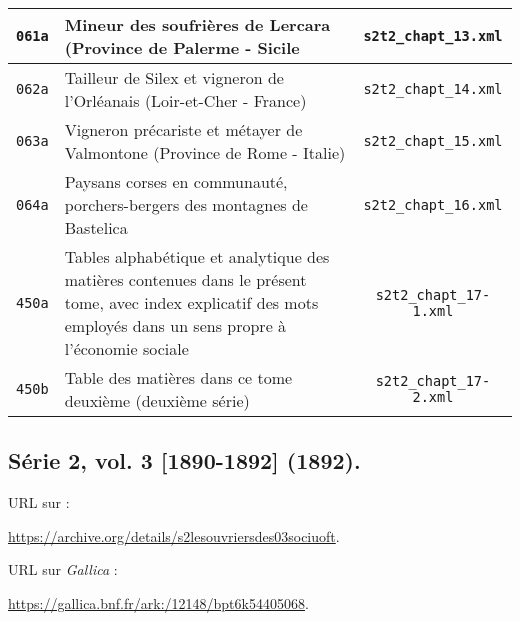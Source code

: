\begin{center}
\begin{longtable}{ | c | p{9.5cm} | c | }
\texttt{061a} & Mineur des soufrières de Lercara (Province de Palerme - Sicile & \texttt{s2t2\_chapt\_13.xml} \\ \hline
\texttt{062a} & Tailleur de Silex et vigneron de l'Orléanais (Loir-et-Cher - France) & \texttt{s2t2\_chapt\_14.xml} \\ \hline
\texttt{063a} & Vigneron précariste et métayer de Valmontone (Province de Rome - Italie) & \texttt{s2t2\_chapt\_15.xml} \\ \hline
\texttt{064a} & Paysans corses en communauté, porchers-bergers des montagnes de Bastelica & \texttt{s2t2\_chapt\_16.xml} \\ \hline
\texttt{450a} & Tables alphabétique et analytique des matières contenues dans le présent tome, avec index explicatif des mots employés dans un sens propre à l'économie sociale & \texttt{s2t2\_chapt\_17-1.xml} \\ \hline
\texttt{450b} & Table des matières dans ce tome deuxième (deuxième série) & \texttt{s2t2\_chapt\_17-2.xml} \\ \hline
\end{longtable}
\end{center}

\subsection{Série 2, vol. 3 [1890-1892] (1892).}
\label{mappings2t3}

URL sur \ia{} : 

\url{https://archive.org/details/s2lesouvriersdes03sociuoft}.

URL sur \textit{Gallica} : 

\url{https://gallica.bnf.fr/ark:/12148/bpt6k54405068}.

